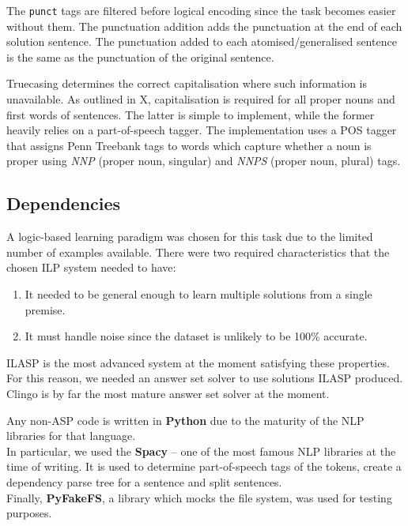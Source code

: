 The \verb_punct_ tags are filtered before logical encoding since the task becomes easier without them.
The punctuation addition adds the punctuation at the end of each solution sentence.
The punctuation added to each atomised/generalised sentence is the same as the punctuation of the original sentence.

Truecasing determines the correct capitalisation where such information is unavailable.
As outlined in X, capitalisation is required for all proper nouns and first words of sentences. 
The latter is simple to implement, while the former heavily relies on a part-of-speech tagger. 
The implementation uses a POS tagger that assigns Penn Treebank tags to words which capture whether a noun is proper using \textit{NNP} (proper noun, singular) and \textit{NNPS} (proper noun, plural) tags.


\clearpage 

\subsection{Dependencies}


A logic-based learning paradigm was chosen for this task due to the limited number of examples available.
There were two required characteristics that the chosen ILP system needed to have: 
\begin{enumerate}
    \item It needed to be general enough to learn multiple solutions from a single premise.
    \item It must handle noise since the dataset is unlikely to be 100\% accurate.
\end{enumerate}
ILASP \cite{RefWorks:RefID:18-law2020ilasp} is the most advanced system at the moment satisfying these properties.
For this reason, we needed an answer set solver to use solutions ILASP produced. 
Clingo \cite{RefWorks:RefID:22-clingo} is by far the most mature answer set solver at the moment.

Any non-ASP code is written in \textbf{Python} due to the maturity of the NLP libraries for that language. \\
In particular, we used the \textbf{Spacy} -- one of the most famous NLP libraries at the time of writing.
It is used to determine part-of-speech tags of the tokens, create a dependency parse tree for a sentence and split sentences. \\
Finally, \textbf{PyFakeFS}, a library which mocks the file system, was used for testing purposes.

